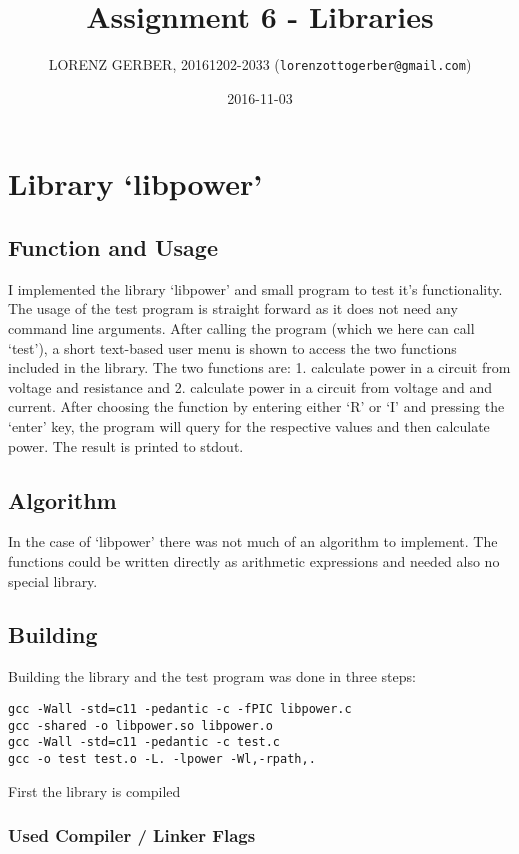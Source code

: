 \documentclass[a4paper,11pt,twoside]{article}
\title{Assignment 6 - Libraries}
\author{LORENZ GERBER, 20161202-2033 ({\tt{lorenzottogerber@gmail.com}})}
\date{2016-11-03}
\begin{document}
\lstset{language=C}
\maketitle
\thispagestyle{empty}
\newpage

\clearpage
{}

\section{Library `libpower'}
\subsection{Function and Usage}
I implemented the library `libpower' and small program to test it's functionality. The usage of the test program is straight forward as it does not need any command line arguments. After calling the program (which we here can call `test'), a short text-based user menu is shown to access the two functions included in the library. The two functions are: 1. calculate power in a circuit from voltage and resistance and 2. calculate power in a circuit from voltage and and current. After choosing the function by entering either `R' or `I' and pressing the `enter' key, the program will query for the respective values and then calculate power. The result is printed to stdout.  

\subsection{Algorithm}
In the case of `libpower' there was not much of an algorithm to implement. The functions could be written directly as arithmetic expressions and needed also no special library.  

\subsection{Building}
Building the library and the test program was done in three steps:
\begin{verbatim}
gcc -Wall -std=c11 -pedantic -c -fPIC libpower.c
gcc -shared -o libpower.so libpower.o
gcc -Wall -std=c11 -pedantic -c test.c
gcc -o test test.o -L. -lpower -Wl,-rpath,.
\end{verbatim}
First the library is compiled


\subsubsection{Used Compiler / Linker Flags}
\end{document}
